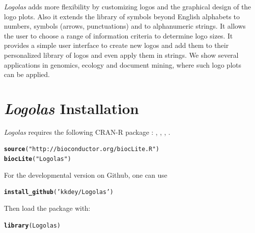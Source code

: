\documentclass[12pt]{article}\usepackage[]{graphicx}\usepackage[usenames,dvipsnames]{color}
\makeatletter
\newcommand{\hlstr}[1]{\textcolor[rgb]{0.192,0.494,0.8}{#1}}%
\newcommand{\hlstd}[1]{\textcolor[rgb]{0.345,0.345,0.345}{#1}}%
\newcommand{\hlkwd}[1]{\textcolor[rgb]{0.737,0.353,0.396}{\textbf{#1}}}%
\newenvironment{kframe}{%
 \def\at@end@of@kframe{}%
 \ifinner\ifhmode%
  \def\at@end@of@kframe{\end{minipage}}%
  \begin{minipage}{\columnwidth}%
 \fi\fi%
 \def\FrameCommand##1{\hskip\@totalleftmargin \hskip-\fboxsep
 \colorbox{shadecolor}{##1}\hskip-\fboxsep
     \hskip-\linewidth \hskip-\@totalleftmargin \hskip\columnwidth}%
 \MakeFramed {\advance\hsize-\width
   \@totalleftmargin\z@ \linewidth\hsize
   \@setminipage}}%
 {\par\unskip\endMakeFramed%
 \at@end@of@kframe}
\newenvironment{knitrout}{}{} %
\newcommand{\Logolas}{\textit{Logolas}}
\makeatother
\begin{document}
\Logolas{} adds more flexibility by customizing logos and the graphical design of the logo plots. Also it extends the library of symbols beyond English alphabets to numbers, symbols (arrows, punctuations) and to alphanumeric strings. It allows the user to choose a range of information criteria to determine logo sizes. It provides a simple user interface to create new logos and add them to their personalized library of logos and even apply them in strings. We show several applications in genomics, ecology and document mining, where such logo plots can be applied.

\newpage

\section{\Logolas{} Installation}

\Logolas{} requires the following CRAN-R package : , , , .

\begin{knitrout}
\color{fgcolor}\begin{kframe}
\begin{alltt}
\hlkwd{source}\hlstd{(}\hlstr{"http://bioconductor.org/biocLite.R"}\hlstd{)}
\hlkwd{biocLite}\hlstd{(}\hlstr{"Logolas"}\hlstd{)}
\end{alltt}
\end{kframe}
\end{knitrout}

For the developmental version on Github, one can use

\begin{knitrout}
\color{fgcolor}\begin{kframe}
\begin{alltt}
\hlkwd{install_github}\hlstd{(}\hlstr{'kkdey/Logolas'}\hlstd{)}
\end{alltt}
\end{kframe}
\end{knitrout}

Then load the package with:

\begin{knitrout}
\color{fgcolor}\begin{kframe}
\begin{alltt}
\hlkwd{library}\hlstd{(Logolas)}
\end{alltt}
\end{kframe}
\end{knitrout}
\end{document}
